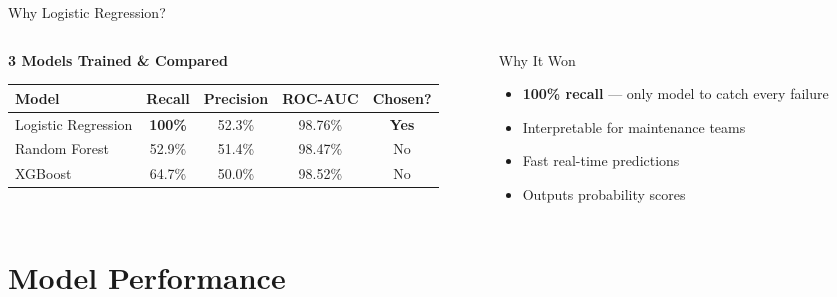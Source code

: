 \documentclass[aspectratio=169]{beamer}
\begin{document}
\begin{frame}{Why Logistic Regression?}

  \begin{columns}[T]
    \begin{column}{0.60\textwidth}
      \textbf{3 Models Trained \& Compared}

      \vspace{0.3cm}
      \begin{tabular}{lcccc}
        \toprule
        \textbf{Model} & \textbf{Recall} & \textbf{Precision} & \textbf{ROC-AUC} & \textbf{Chosen?} \\
        \midrule
        Logistic Regression & \textcolor{safegreen}{\textbf{100\%}} & 52.3\% & 98.76\% & \textcolor{safegreen}{\textbf{Yes}} \\
        Random Forest       & 52.9\%                                & 51.4\% & 98.47\% & \textcolor{alertred}{No} \\
        XGBoost             & 64.7\%                                & 50.0\% & 98.52\% & \textcolor{alertred}{No} \\
        \bottomrule
      \end{tabular}
    \end{column}

    \begin{column}{0.37\textwidth}
      \begin{exampleblock}{Why It Won}
        \begin{itemize}
          \item \textbf{100\% recall} --- only model to catch every failure
          \item Interpretable for maintenance teams
          \item Fast real-time predictions
          \item Outputs probability scores
        \end{itemize}
      \end{exampleblock}
    \end{column}
  \end{columns}

\end{frame}

\section{Model Performance}
\end{document}
